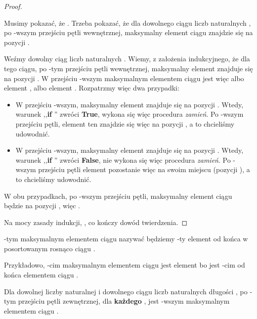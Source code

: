 \begin{example}
\begin{proof}
\begin{itemize}
    Musimy pokazać, że . Trzeba pokazać, że dla dowolnego ciągu liczb naturalnych , po -wszym przejściu pętli wewnętrznej, maksymalny element ciągu  znajdzie się na pozycji .
    
    Weźmy dowolny ciąg liczb naturalnych . Wiemy, z założenia indukcyjnego, że dla tego ciągu, po -tym przejściu pętli wewnętrznej, maksymalny element  znajduje się na pozycji . W przejściu -wszym maksymalnym elementem ciągu  jest więc albo element , albo element . Rozpatrzmy więc dwa przypadki:
    
    \begin{itemize}
        \item W przejściu -wszym, maksymalny element znajduje się na pozycji . Wtedy, warunek ,,\textbf{if} '' zwróci \textbf{True}, wykona się więc procedura \textit{zamień}. Po -wszym przejściu pętli, element ten znajdzie się więc na pozycji , a to chcieliśmy udowodnić.
        
        \item  W przejściu -wszym, maksymalny element znajduje się na pozycji . Wtedy, warunek ,,\textbf{if} '' zwróci \textbf{False}, nie wykona się więc procedura \textit{zamień}. Po -wszym przejściu pętli element pozostanie więc na swoim miejscu (pozycji ), a to chcieliśmy udowodnić.
    \end{itemize}
    
    W obu przypadkach, po -wszym przejściu pętli, maksymalny element ciągu  będzie na pozycji , więc . 
\end{itemize}

Na mocy zasady indukcji, , co kończy dowód twierdzenia.
\end{proof}

\begin{definition}
-tym maksymalnym elementem ciągu  nazywać będziemy -ty element od końca w posortowanym rosnąco ciągu . 

Przykładowo, -cim maksymalnym elementem ciągu  jest element  bo  jest -cim od końca elementem ciągu .
\end{definition}

\begin{theo}
\label{theo:invariant_outer_loop}
Dla dowolnej liczby naturalnej  i dowolnego ciągu liczb naturalnych  długości , po -tym przejściu pętli zewnętrznej, dla \textbf{każdego} ,  jest -wszym maksymalnym elementem ciągu .


\end{theo}
\end{example}
